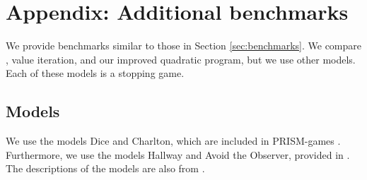 \chapter{Appendix: Additional benchmarks} \label{sec:appendix}
We provide benchmarks similar to those in Section \ref{sec:benchmarks}. We compare \conQP{}, value iteration, and our improved quadratic program, but we use other models. Each of these models is a stopping game.
\section{Models}
We use the models Dice \cite{dice} and Charlton\cite{charlton}, which are included in PRISM-games \cite{PRISM-games}. Furthermore, we use the models Hallway and Avoid the Observer, provided in \cite{cav20}. The descriptions of the models are also from \cite{cav20}.
